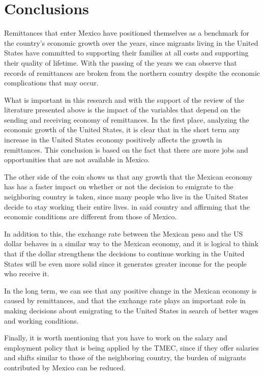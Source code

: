 \documentclass[12pt,english, spanish]{smfart}
\begin{document}
\section{Conclusions}
Remittances that enter Mexico have positioned themselves as a benchmark for the country's economic growth over the years, since migrants living in the United States have committed to supporting their families at all costs and supporting their quality of lifetime. With the passing of the years we can observe that records of remittances are broken from the northern country despite the economic complications that may occur.\par
What is important in this research and with the support of the review of the literature presented above is the impact of the variables that depend on the sending and receiving economy of remittances. In the first place, analyzing the economic growth of the United States, it is clear that in the short term any increase in the United States economy positively affects the growth in remittances. This conclusion is based on the fact that there are more jobs and opportunities that are not available in Mexico.\par
The other side of the coin shows us that any growth that the Mexican economy has has a faster impact on whether or not the decision to emigrate to the neighboring country is taken, since many people who live in the United States decide to stay working their entire lives. in said country and affirming that the economic conditions are different from those of Mexico.\par
In addition to this, the exchange rate between the Mexican peso and the US dollar behaves in a similar way to the Mexican economy, and it is logical to think that if the dollar strengthens the decisions to continue working in the United States will be even more solid since it generates greater income for the people who receive it.\par
In the long term, we can see that any positive change in the Mexican economy is caused by remittances, and that the exchange rate plays an important role in making decisions about emigrating to the United States in search of better wages and working conditions. \par Finally, it is worth mentioning that you have to work on the salary and employment policy that is being applied by the TMEC, since if they offer salaries and shifts similar to those of the neighboring country, the burden of migrants contributed by Mexico can be reduced.\par
\end{document}
